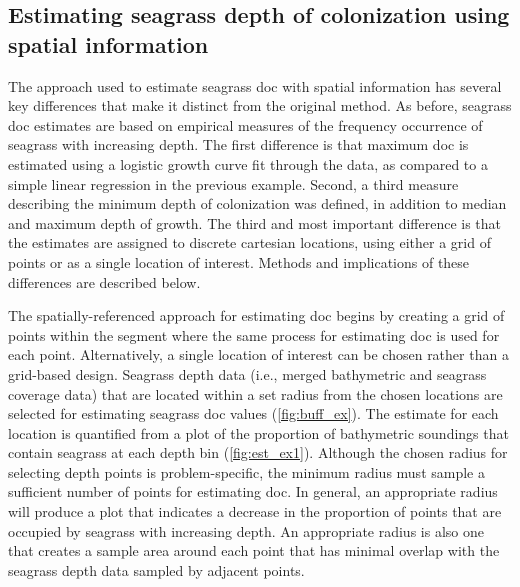 \documentclass[letterpaper,12pt,oneside]{article}\usepackage[]{graphicx}\usepackage[]{color}
\begin{document}
\subsection{Estimating seagrass depth of colonization using spatial information}

The approach used to estimate seagrass \ac{doc} with spatial information has several key differences that make it distinct from the original method.  As before, seagrass \ac{doc} estimates are based on empirical measures of the frequency occurrence of seagrass with increasing depth.  The first difference is that maximum \ac{doc} is estimated using a logistic growth curve fit through the data, as compared to a simple linear regression in the previous example.  Second, a third measure describing the minimum depth of colonization was defined, in addition to median and maximum depth of growth.  The third and most important difference is that the estimates are assigned to discrete cartesian locations, using either a grid of points or as a single location of interest. Methods and implications of these differences are described below.                                   

The spatially-referenced approach for estimating \ac{doc} begins by creating a grid of points within the segment where the same process for estimating \ac{doc} is used for each point.  Alternatively, a single location of interest can be chosen rather than a grid-based design.  Seagrass depth data (i.e., merged bathymetric and seagrass coverage data) that are located within a set radius from the chosen locations are selected for estimating seagrass \ac{doc} values (\cref{fig:buff_ex}). The estimate for each location is quantified from a plot of the proportion of bathymetric soundings that contain seagrass at each depth bin (\cref{fig:est_ex1}).  Although the chosen radius for selecting depth points is problem-specific, the minimum radius must sample a sufficient number of points for estimating \ac{doc}.  In general, an appropriate radius will produce a plot that indicates a decrease in the proportion of points that are occupied by seagrass with increasing depth. An appropriate radius is also one that creates a sample area around each point that has minimal overlap with the seagrass depth data sampled by adjacent points.     
\end{document}

